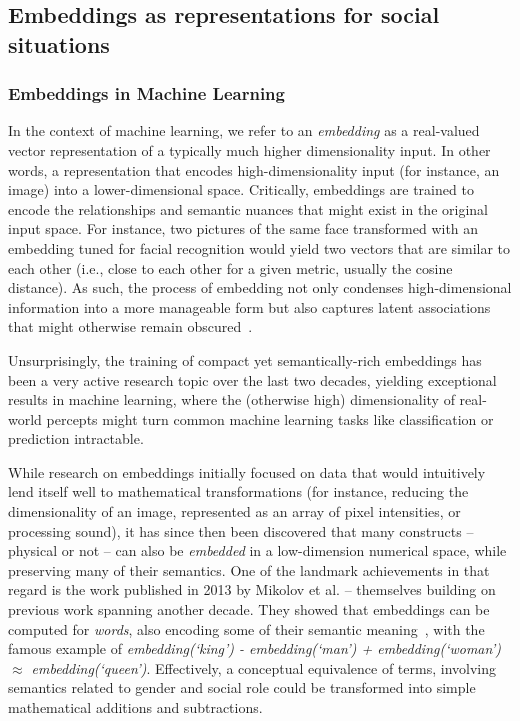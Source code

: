 \subsection{Embeddings as representations for social situations}

\subsubsection{Embeddings in Machine Learning}

In the context of machine learning, we refer to an \emph{embedding} as a
real-valued vector representation of a typically much higher dimensionality
input. In other words, a representation that encodes high-dimensionality input
(for instance, an image) into a lower-dimensional space. Critically, embeddings
are trained to encode the relationships and semantic nuances that might exist in
the original input space. For instance, two pictures of the same face
transformed with an embedding tuned for facial recognition would yield two
vectors that are similar to each other (i.e., close to each other for a given
metric, usually the cosine distance). As such, the process of embedding not only
condenses high-dimensional information into a more manageable form but also
captures latent associations that might otherwise remain
obscured~\cite{bengio2009learning}.

Unsurprisingly, the training of compact yet semantically-rich embeddings has
been a very active research topic over the last two decades, yielding
exceptional results in machine learning, where the (otherwise high)
dimensionality of real-world percepts might turn common machine learning
tasks like classification or prediction intractable.

While research on embeddings initially focused on data that would intuitively
lend itself well to mathematical transformations (for instance, reducing the
dimensionality of an image, represented as an array of pixel intensities, or
processing sound), it has since then been discovered that many constructs --
physical or not -- can also be \emph{embedded} in a low-dimension numerical
space, while preserving many of their semantics. One of the landmark
achievements in that regard is the work published in 2013 by Mikolov et al. --
themselves building on previous work spanning another decade.  They showed that
embeddings can be computed for \emph{words}, also encoding some of their
semantic meaning~\cite{mikolov2013efficient}, with the famous example of
\emph{embedding(`king') - embedding(`man') + embedding(`woman') $\approx$
embedding(`queen')}. Effectively, a conceptual equivalence of terms, involving
semantics related to gender and social role could be transformed into simple
mathematical additions and subtractions.

